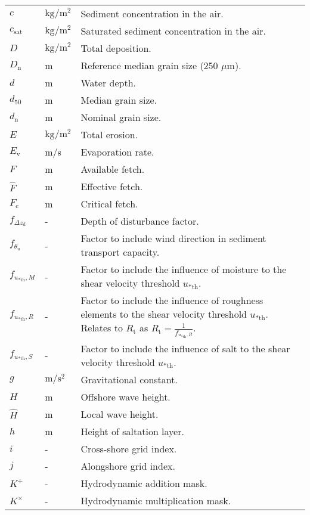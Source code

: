 \begin{longtable}{p{1cm} p{2cm} p{7.75cm}}
  $c$ & $\mathrm{kg/m^2}$ & Sediment concentration in the air. \\
  $c_{\mathrm{sat}}$ & $\mathrm{kg/m^2}$ & Saturated sediment concentration in the air. \\
  $D$ & $\mathrm{kg/m^2}$ & Total deposition. \\
  $D_{\mathrm{n}}$ & m & Reference median grain size (250 $\mu \mathrm{m}$). \\
  $d$ & m & Water depth. \\
  $d_{50}$ & m & Median grain size. \\
  $d_{\mathrm{n}}$ & m & Nominal grain size. \\
  $E$ & $\mathrm{kg/m^2}$ & Total erosion. \\
  $E_{\mathrm{v}}$ & m/s & Evaporation rate. \\
  $F$ & m & Available fetch. \\
  $\hat{F}$ & m & Effective fetch. \\
  $F_{\mathrm{c}}$ & m & Critical fetch.\\
  $f_{\Delta z_\mathrm{d}}$ & - & Depth of disturbance factor. \\
  $f_{\theta_u}$ & - & Factor to include wind direction in sediment transport capacity. \\
  $f_{u_\mathrm{* th},M}$ & - & Factor to include the influence of moisture to the shear velocity threshold $u_{\mathrm{* th}}$. \\
  $f_{u_\mathrm{* th},R}$ & - & Factor to include the influence of roughness elements to the shear velocity threshold $u_{\mathrm{* th}}$.  Relates to $R_{\mathrm{t}}$ as $R_{\mathrm{t}} = \frac{1}{f_{u_\mathrm{* th},R}}$. \\
  $f_{u_\mathrm{* th},S}$ & - & Factor to include the influence of salt to the shear velocity threshold $u_{\mathrm{* th}}$. \\
  $g$ & $\mathrm{m/s^2}$ & Gravitational constant. \\
  $H$ & m & Offshore wave height. \\
  $\hat{H}$ & m & Local wave height. \\
  $h$ & m & Height of saltation layer. \\
  $i$ & - & Cross-shore grid index. \\
  $j$ & - & Alongshore grid index. \\
  $K^{\mathrm{+}}$ & - & Hydrodynamic addition mask. \\
  $K^{\mathrm{\times}}$ & - & Hydrodynamic multiplication mask. \\

\end{longtable}

